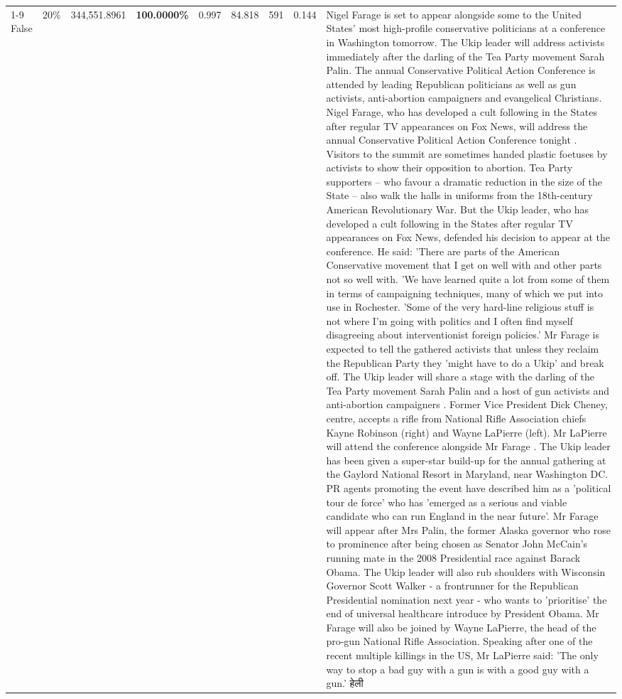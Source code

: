 \begin{table}[H]
\begin{tabular}{lllrlllll}
\cline{1-9} \cline{2-9}
False & 20\% & 344,551.8961 & \bfseries \color{red} 100.0000\% & 0.997 & 84.818 & 591 & 0.144 & Nigel Farage is set to appear alongside some to the United States' most high-profile conservative politicians at a conference in Washington tomorrow. The Ukip leader will address activists immediately after the darling of the Tea Party movement Sarah Palin. The annual Conservative Political Action Conference is attended by leading Republican politicians as well as gun activists, anti-abortion campaigners and evangelical Christians. Nigel Farage, who has developed a cult following in the States after regular TV appearances on Fox News, will address the annual Conservative Political Action Conference tonight . Visitors to the summit are sometimes handed plastic foetuses by activists to show their opposition to abortion. Tea Party supporters – who favour a dramatic reduction in the size of the State – also walk the halls in uniforms from the 18th-century American Revolutionary War. But the Ukip leader, who has developed a cult following in the States after regular TV appearances on Fox News, defended his decision to appear at the conference. He said: 'There are parts of the American Conservative movement that I get on well with and other parts not so well with. 'We have learned quite a lot from some of them in terms of campaigning techniques, many of which we put into use in Rochester. 'Some of the very hard-line religious stuff is not where I'm going with politics and I often find myself disagreeing about interventionist foreign policies.' Mr Farage is expected to tell the gathered activists that unless they reclaim the Republican Party they 'might have to do a Ukip' and break off. The Ukip leader will share a stage with the darling of the Tea Party movement Sarah Palin and a host of gun activists and anti-abortion campaigners . Former Vice President Dick Cheney, centre, accepts a rifle from National Rifle Association chiefs Kayne Robinson (right) and Wayne LaPierre (left). Mr LaPierre will attend the conference alongside Mr Farage . The Ukip leader has been given a super-star build-up for the annual gathering at the Gaylord National Resort in Maryland, near Washington DC. PR agents promoting the event have described him as a 'political tour de force' who has 'emerged as a serious and viable candidate who can run England in the near future'. Mr Farage will appear after Mrs Palin, the former Alaska governor who rose to prominence after being chosen as Senator John McCain's running mate in the 2008 Presidential race against Barack Obama. The Ukip leader will also rub shoulders with Wisconsin Governor Scott Walker - a frontrunner for the Republican Presidential nomination next year - who wants to 'prioritise' the end of universal healthcare introduce by President Obama. Mr Farage will also be joined by Wayne LaPierre, the head of the pro-gun National Rifle Association. Speaking after one of the recent multiple killings in the US, Mr LaPierre said: 'The only way to stop a bad guy with a gun is with a good guy with a gun.' हेली \\

\end{tabular}
\end{table}
